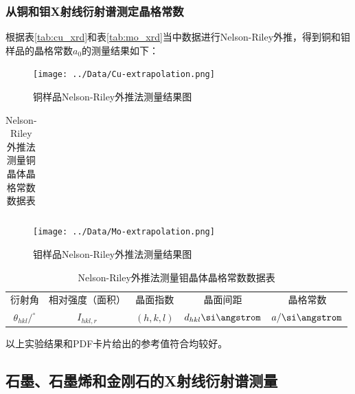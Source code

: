 \documentclass{thuemp}
\begin{document}
\subsubsection{从铜和钼X射线衍射谱测定晶格常数}

根据表\ref{tab:cu_xrd}和表\ref{tab:mo_xrd}当中数据进行Nelson-Riley外推，得到铜和钼样品的晶格常数$a_0$的测量结果如下：

\begin{figure}[H]
    \centering
    \texttt{[image: ../Data/Cu-extrapolation.png]}
    \caption{铜样品Nelson-Riley外推法测量结果图}
    \label{fig:cu_xrd_extrapol}
\end{figure}

\begin{table}[H]
    \centering
    \captionnamefont{\wuhao\bf\heiti}
    \captiontitlefont{\wuhao\bf\heiti}
    \caption{Nelson-Riley外推法测量铜晶体晶格常数数据表}
    \label{tab:cu_xrd_extrapol}
    \liuhao
    \begin{tabular}{ccccc}
        \toprule
        \midrule
        \bottomrule
    \end{tabular}
\end{table}

\begin{figure}[H]
    \centering
    \texttt{[image: ../Data/Mo-extrapolation.png]}
    \caption{钼样品Nelson-Riley外推法测量结果图}
    \label{fig:mo_xrd_extrapol}
\end{figure}

\begin{table}[H]
    \centering
    \captionnamefont{\wuhao\bf\heiti}
    \captiontitlefont{\wuhao\bf\heiti}
    \caption{Nelson-Riley外推法测量钼晶体晶格常数数据表}
    \label{tab:mo_xrd_extrapol}
    \liuhao
    \begin{tabular}{ccccc}
        \toprule
        衍射角 & 相对强度（面积）& 晶面指数 & 晶面间距 & 晶格常数 \\
        $\theta_{hkl}/^\circ$ & $I_{hkl,r}$ & $(h,k,l)$ & $d_{hkl}\text{\si\angstrom}$ & $a/\text{\si\angstrom}$\\
        \midrule
        \bottomrule
    \end{tabular}
\end{table}

以上实验结果和PDF卡片给出的参考值符合均较好。

\subsection{石墨、石墨烯和金刚石的X射线衍射谱测量}
\end{document}
